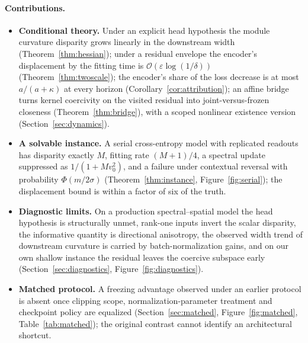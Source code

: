 \paragraph{Contributions.}
\begin{itemize}
\item \textbf{Conditional theory.} Under an explicit head hypothesis the
      module curvature disparity grows linearly in the downstream width
      (Theorem~\ref{thm:hessian}); under a residual envelope the encoder's
      displacement by the fitting time is
      $\mathcal{O}(\varepsilon\log(1/\delta))$ (Theorem~\ref{thm:twoscale});
      the encoder's share of the loss decrease is at most $a/(a+\kappa)$ at
      every horizon (Corollary~\ref{cor:attribution}); an affine bridge turns
      kernel coercivity on the visited residual into joint-versus-frozen
      closeness (Theorem~\ref{thm:bridge}), with a scoped nonlinear
      existence version (Section~\ref{sec:dynamics}).
\item \textbf{A solvable instance.} A serial cross-entropy model with
      replicated readouts has disparity exactly $M$, fitting rate $(M+1)/4$,
      a spectral update suppressed as $1/(1+Mv_0^2)$, and a failure under
      contextual reversal with probability $\Phi(m/2\sigma)$
      (Theorem~\ref{thm:instance}, Figure~\ref{fig:serial}); the displacement
      bound is within a factor of six of the truth.
\item \textbf{Diagnostic limits.} On a production spectral--spatial model the
      head hypothesis is structurally unmet, rank-one inputs invert the
      scalar disparity, the informative quantity is directional anisotropy,
      the observed width trend of downstream curvature is carried by
      batch-normalization gains, and on our own shallow instance the residual
      leaves the coercive subspace early (Section~\ref{sec:diagnostics},
      Figure~\ref{fig:diagnostics}).
\item \textbf{Matched protocol.} A freezing advantage observed under an
      earlier protocol is absent once clipping scope, normalization-parameter
      treatment and checkpoint policy are equalized
      (Section~\ref{sec:matched}, Figure~\ref{fig:matched},
      Table~\ref{tab:matched}); the original contrast cannot identify an
      architectural shortcut.
\end{itemize}

